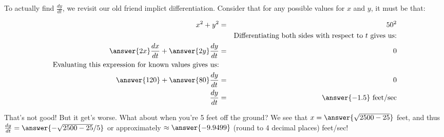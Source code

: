 \documentclass{ximera}
\begin{document}
\begin{question}
\begin{explanation}
\begin{image}
\end{image}

To actually find $\frac{dy}{dt}$, we revisit our old friend implict differentiation.  Consider that for any possible values for $x$ and $y$, it must be that:

\begin{eqnarray*}
x^2+ y^2 &=& 50^2\\
&&\text{Differentiating both sides with respect to $t$ gives us:}\\
\answer{2x}\frac{dx}{dt}+\answer{2y}\frac{dy}{dt}&=& 0\\
\text{Evaluating this expression for known values gives us:}\\
\answer{120}+\answer{80}\frac{dy}{dt}&=& 0\\
\frac{dy}{dt}&=& \answer{-1.5}\ \text{feet/sec}
\end{eqnarray*}

That's not good!  But it get's worse.  What about when you're 5 feet off the ground?  We see that $x=\answer{\sqrt{2500-25}}$ feet, and thus $\frac{dy}{dt}=\answer{-\sqrt{2500-25}/5}$ or approximately $\approx \answer{-9.9499}$ (round to 4 decimal places) feet/sec!


\end{explanation}

\end{question}
\end{document}
